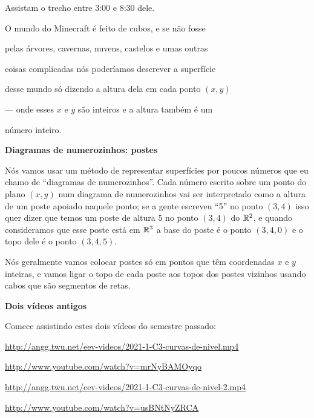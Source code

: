 \documentclass[oneside,12pt]{article}
\begin{document}
\ssk

Assistam o trecho entre 3:00 e 8:30 dele.

\bsk

O mundo do Minecraft é feito de cubos, e se não fosse

pelas árvores, cavernas, nuvens, castelos e umas outras

coisas complicadas nós poderíamos descrever a superfície

desse mundo só dizendo a altura dela em cada ponto $(x,y)$

--- onde esses $x$ e $y$ são inteiros e a altura também é um

número inteiro.


\newpage


{\bf Diagramas de numerozinhos: postes}

Nós vamos usar um método de representar superfícies por poucos números
que eu chamo de ``diagramas de numerozinhos''. Cada número escrito
sobre um ponto do plano $(x,y)$ num diagrama de numerozinhos vai ser
interpretado como a altura de um poste apoiado naquele ponto; se a
gente escreveu ``5'' no ponto $(3,4)$ isso quer dizer que temos um
poste de altura 5 no ponto $(3,4)$ do $\mathbb{R}^2$, e quando consideramos
que esse poste está em $\mathbb{R}^3$ a base do poste é o ponto $(3,4,0)$ e o
topo dele é o ponto $(3,4,5)$.

Nós geralmente vamos colocar postes só em pontos que têm coordenadas
$x$ e $y$ inteiras, e vamos ligar o topo de cada poste aos topos dos
postes vizinhos usando cabos que são segmentos de retas.

\newpage

{\bf Dois vídeos antigos}

Comece assistindo estes dois vídeos do semestre passado:


\ssk

{\footnotesize


\url{http://angg.twu.net/eev-videos/2021-1-C3-curvas-de-nivel.mp4}

\url{http://www.youtube.com/watch?v=mrNyBAMOyqo}

\msk


\url{http://angg.twu.net/eev-videos/2021-1-C3-curvas-de-nivel-2.mp4}

\url{http://www.youtube.com/watch?v=usBNtNyZRCA}

}
\end{document}
